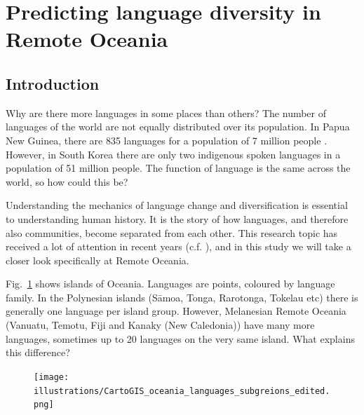 \documentclass[a4paper,10pt]{article} %
\begin{document}


\newpage

\section{Predicting language diversity in Remote Oceania}
\label{chapter_pol_complex}
\subsection{Introduction}
\doublespacing
Why are there more languages in some places than others? The number of languages of the world are not equally distributed over its population. In Papua New Guinea, there are 835 languages for a population of 7 million people \citep{ethnologue22, cia_world_factbook_2019}. However, in South Korea there are only two indigenous spoken languages in a population of 51 million people. The function of language is the same across the world, so how could this be?

Understanding the mechanics of language change and diversification is essential to understanding human history. It is the story of how languages, and therefore also communities, become separated from each other. This research topic has received a lot of attention in recent years (c.f. \citet{gavin2017process,  greenhill2015demographic, Pacheco_Coelho_2019, hua2019ecological}), and in this study we will take a closer look specifically at Remote Oceania. 

Fig.~\ref{RO_overnight_coloured_dots} shows islands of Oceania. Languages are points, coloured by language family. In the Polynesian islands (S\={a}moa, Tonga, Rarotonga, Tokelau etc) there is generally one language per island group. However, Melanesian Remote Oceania (Vanuatu, Temotu, Fiji and Kanaky (New Caledonia)) have many more languages, sometimes up to 20 languages on the very same island. What explains this difference?



\begin{figure}
\centering
\texttt{[image: illustrations/CartoGIS\_oceania\_languages\_subgreions\_edited.png]}
\caption{}
\label{RO_overnight_coloured_dots}
\end{figure}





\end{document}
